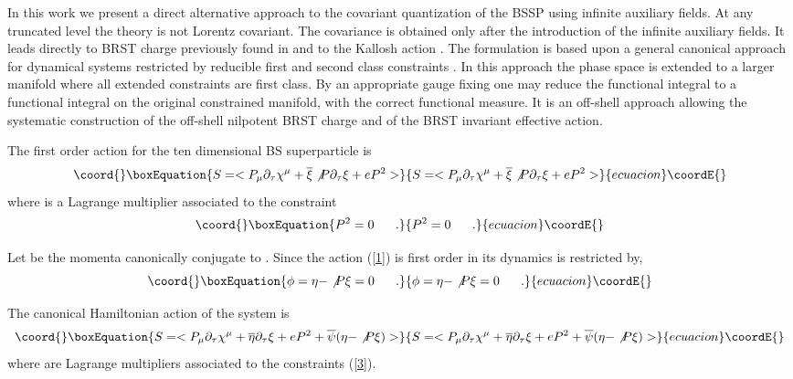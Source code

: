 \documentclass[a4paper,10pt]{article}
\begin{document}
In this work we present a direct alternative approach to  the
covariant quantization of the BSSP using infinite  auxiliary
fields. At any truncated level the theory is not Lorentz
covariant.  The covariance is obtained only after the introduction
of the infinite  auxiliary fields. It leads directly to BRST
charge previously found in \cite{[9]} and  to the Kallosh action \cite{[10]}.
The formulation is based upon a general canonical  approach for
dynamical systems restricted by reducible first and second  class
constraints \cite{[11],[12]}. In this approach the phase space is
extended to a larger manifold where all extended constraints are
first class. By an appropriate gauge fixing one may reduce the
functional integral to a functional integral on the original
constrained manifold, with the correct functional measure. It is
an off-shell approach allowing the systematic construction of the
off-shell nilpotent BRST charge and of the BRST invariant
effective action.

The first order action for the ten dimensional BS superparticle is
\begin{equation}\coord{}\boxEquation{
\label{1}
S=<P_\mu \partial_\tau \chi^\mu +\ov{\xi} \np
\partial_\tau \xi+eP^2>
}{
S=<P_\mu \partial_\tau \chi^\mu +\ov{\xi} \np
\partial_\tau \xi+eP^2>
}{ecuacion}\coordE{}\end{equation}
where \coordHE{} is a Lagrange multiplier associated to the constraint
\begin{equation}\coord{}\boxEquation{
\label{2}
P^2=0\ \ \ \ \ .
}{
P^2=0\ \ \ \ \ .
}{ecuacion}\coordE{}\end{equation}

Let \myHighlight{$\eta$}\coordHE{} be the momenta canonically conjugate to \myHighlight{$\xi$}\coordHE{}. Since the action
(\ref{1}) is first order in \myHighlight{$\partial_\tau\xi$}\coordHE{} its dynamics is restricted by,
\begin{equation}\coord{}\boxEquation{
\label{3}
\phi =\eta -\np \xi =0 \ \ \ \ \ .
}{
\phi =\eta -\np \xi =0 \ \ \ \ \ .
}{ecuacion}\coordE{}\end{equation}

The canonical Hamiltonian action of the system is
\begin{equation}\coord{}\boxEquation{
\label{4}
S=<P_\mu \partial_\tau \chi^\mu +\ov{\eta} \partial_\tau \xi
+eP^2+ \ov{\psi}(\eta -\np \xi )>
}{
S=<P_\mu \partial_\tau \chi^\mu +\ov{\eta} \partial_\tau \xi
+eP^2+ \ov{\psi}(\eta -\np \xi )>
}{ecuacion}\coordE{}\end{equation}
where
\myHighlight{$\ov{\psi}$}\coordHE{} are Lagrange multipliers associated to the constraints
(\ref{3}).
\end{document}
